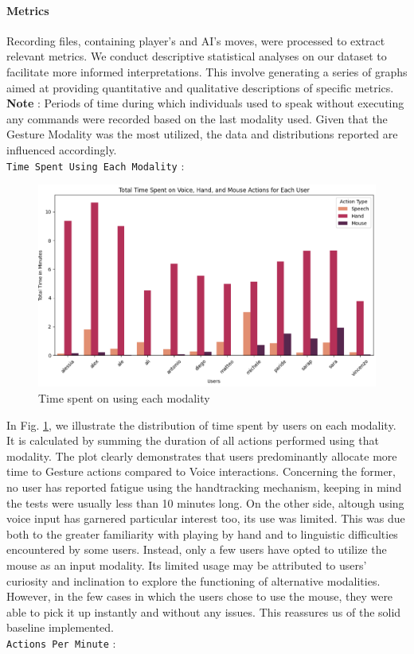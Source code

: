 \documentclass[a4paper, 11pt, twocolumn]{IEEEtran}
\begin{document}
    \paragraph*{Metrics} Recording files, containing player's and AI's moves, were processed to extract relevant metrics. We conduct descriptive statistical analyses on our dataset to facilitate more informed interpretations. This involve generating a series of graphs aimed at providing quantitative and qualitative descriptions of specific metrics. \\ \textbf{Note} : Periods of time during which individuals used to speak without executing any commands were recorded based on the last modality used. Given that the Gesture Modality was the most utilized, the data and distributions reported are influenced accordingly. \\\texttt{Time Spent Using Each Modality} : 
    \begin{figure}
        \centering
        \includegraphics[width=.5\textwidth]{images/total_time.png}
        \caption{Time spent on using each modality}
        \label{fig:total_time}
    \end{figure}
    In Fig. \ref{fig:total_time}, we illustrate the distribution of time spent by users on each modality. It is calculated by summing the duration of all actions performed using that modality. The plot clearly demonstrates that users predominantly allocate more time to Gesture actions compared to Voice interactions. Concerning the former, no user has reported fatigue using the handtracking mechanism, keeping in mind the tests were usually less than 10 minutes long. On the other side, altough using voice input has garnered particular interest too, its use was limited. This was due both to the greater familiarity with playing by hand and to linguistic difficulties encountered by some users. Instead, only a few users have opted to utilize the mouse as an input modality. Its limited usage may be attributed to users' curiosity and inclination to explore the functioning of alternative modalities. However, in the few cases in which the users chose to use the mouse, they were able to pick it up instantly and without any issues. This reassures us of the solid baseline implemented.\\\texttt{Actions Per Minute} :
\end{document}
